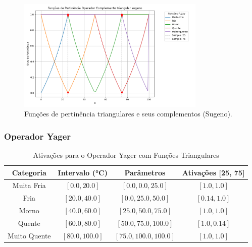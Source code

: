 \documentclass[a4paper,12pt]{article}
\begin{document}
\begin{figure}[H]
    \centering
    \includegraphics[width=0.8\textwidth]{img/funções_de_pertinência_operador_complemento_triangular_sugeno_fuzzificado.png}
    \caption{Funções de pertinência triangulares e seus complementos (Sugeno).}
    \label{fig:complemento_sugeno_triangular}
\end{figure}

\subsubsection{Operador Yager}

\begin{table}[H]
\centering
\caption{Ativações para o Operador Yager com Funções Triangulares}
\begin{tabular}{|c|c|c|c|}
\hline
\textbf{Categoria}    & \textbf{Intervalo (°C)} & \textbf{Parâmetros}       & \textbf{Ativações [25, 75]} \\ \hline
Muita Fria            & $[0.0, 20.0]$          & $[0.0, 0.0, 25.0]$        & $[1.0, 1.0]$               \\ \hline
Fria                  & $[20.0, 40.0]$         & $[0.0, 25.0, 50.0]$       & $[0.14, 1.0]$              \\ \hline
Morno                 & $[40.0, 60.0]$         & $[25.0, 50.0, 75.0]$      & $[1.0, 1.0]$               \\ \hline
Quente                & $[60.0, 80.0]$         & $[50.0, 75.0, 100.0]$     & $[1.0, 0.14]$              \\ \hline
Muito Quente          & $[80.0, 100.0]$        & $[75.0, 100.0, 100.0]$    & $[1.0, 1.0]$               \\ \hline
\end{tabular}
\end{table}
\end{document}
